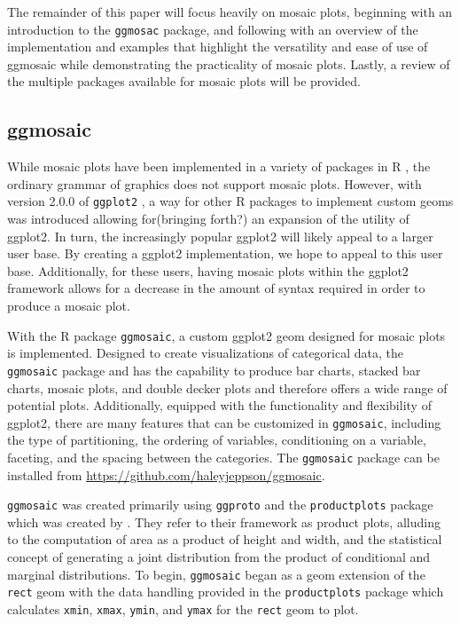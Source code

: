 The remainder of this paper will focus heavily on mosaic plots,
beginning with an introduction to the \texttt{ggmosac} package, and
following with an overview of the implementation and examples that
highlight the versatility and ease of use of ggmosaic while
demonstrating the practicality of mosaic plots. Lastly, a review of the
multiple packages available for mosaic plots will be provided.

\subsection{ggmosaic}\label{ggmosaic}

While mosaic plots have been implemented in a variety of packages in R
\citep{R2016}, the ordinary grammar of graphics does not support mosaic
plots. However, with version 2.0.0 of \texttt{ggplot2} \citep{ggplot2},
a way for other R packages to implement custom geoms was introduced
allowing for(bringing forth?) an expansion of the utility of ggplot2. In
turn, the increasingly popular ggplot2 will likely appeal to a larger
user base. By creating a ggplot2 implementation, we hope to appeal to
this user base. Additionally, for these users, having mosaic plots
within the ggplot2 framework allows for a decrease in the amount of
syntax required in order to produce a mosaic plot.

With the R package \texttt{ggmosaic}, a custom ggplot2 geom designed for
mosaic plots is implemented. Designed to create visualizations of
categorical data, the \texttt{ggmosaic} package and has the capability
to produce bar charts, stacked bar charts, mosaic plots, and double
decker plots and therefore offers a wide range of potential plots.
Additionally, equipped with the functionality and flexibility of
ggplot2, there are many features that can be customized in
\texttt{ggmosaic}, including the type of partitioning, the ordering of
variables, conditioning on a variable, faceting, and the spacing between
the categories. The \texttt{ggmosaic} package can be installed from
\url{https://github.com/haleyjeppson/ggmosaic}.

\texttt{ggmosaic} was created primarily using \texttt{ggproto} and the
\texttt{productplots} package which was created by \citet{productplots}.
They refer to their framework as product plots, alluding to the
computation of area as a product of height and width, and the
statistical concept of generating a joint distribution from the product
of conditional and marginal distributions. To begin, \texttt{ggmosaic}
began as a geom extension of the \texttt{rect} geom with the data
handling provided in the \texttt{productplots} package which calculates
\texttt{xmin}, \texttt{xmax}, \texttt{ymin}, and \texttt{ymax} for the
\texttt{rect} geom to plot.

